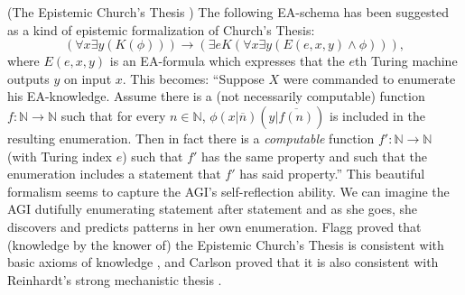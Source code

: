 \documentclass[runningheads]{llncs}
\begin{document}
\begin{example}
\label{ectexample}
  (The Epistemic Church's Thesis \cite{flagg1985church} \cite{carlson2016collapsing})
  The following EA-schema has been suggested as a kind of epistemic formalization
  of Church's Thesis:
  \[
  ( \forall x\exists y (K(\phi))  ) \rightarrow
  ( \exists e K( \forall x\exists y ( E(e,x,y) \wedge \phi  )  )  ),
  \]
  where $E(e,x,y)$ is an EA-formula which expresses that the $e$th Turing machine
  outputs $y$ on input $x$.
  This becomes: ``Suppose $X$ were commanded to enumerate his EA-knowledge.
  Assume there is a (not necessarily computable) function
  $f:\mathbb N\to\mathbb N$ such that for every $n\in\mathbb N$,
  $\phi(x|\overline n)(y|\overline{f(n)})$ is included in the resulting enumeration.
  Then in fact there is a \emph{computable}
  function $f':\mathbb N\to\mathbb N$ (with Turing index $e$)
  such that $f'$ has the same property and such that the enumeration includes
  a statement that $f'$ has said property.''
  This beautiful formalism seems to capture the AGI's self-reflection ability.
  We can imagine the AGI dutifully enumerating statement after statement and
  as she goes, she discovers and predicts patterns in her own enumeration.
  Flagg proved that (knowledge by the knower of) the Epistemic Church's Thesis is
  consistent with basic axioms of knowledge \cite{flagg1985church},
  and Carlson proved that it is also consistent with
  Reinhardt's strong mechanistic thesis \cite{carlson2016collapsing}.
\end{example}
\end{document}
